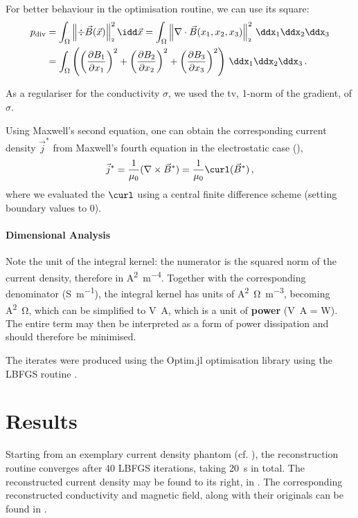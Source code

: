 \documentclass[10pt]{article}
\renewcommand{\norm}[1]{\left\lVert#1\right\rVert_{\scriptscriptstyle 2}}
\begin{document}
  For better behaviour in the optimisation routine, we can use its square:
  \begin{align*}
    p_{\rm div} & = \int_\Omega \norm{\div \vec{B}(\vec{x})}^2 \idd\vec{x} = \int_{\Omega} \norm{\nabla \cdot \vec{B}(x_1, x_2, x_3)}^2 \,\ddx_1\ddx_2\ddx_3                                                                \\
                & = \int_\Omega \left(\left(\frac{\partial B_1}{\partial x_1}\right)^2 + \left(\frac{\partial B_2}{\partial x_2}\right)^2 + \left(\frac{\partial B_3}{\partial x_3}\right)^2\right) \,\ddx_1\ddx_2\ddx_3\,.
  \end{align*}

  As a regulariser for the conductivity $\sigma$, we used the \gls{tv}, 1-norm of the gradient, of $\sigma$.

  Using Maxwell's second equation, one can obtain the corresponding current density $\vec{j}^*$ from Maxwell's fourth equation in the electrostatic case (),
  $$\vec{j}^* = \frac{1}{\mu_0} (\nabla \times \vec{B}^*) = \frac{1}{\mu_0} \curl(\vec{B}^*)\,,$$
  where we evaluated the $\curl$ using a central finite difference scheme (setting boundary values to 0).

  \paragraph{Dimensional Analysis}
  Note the unit of the integral kernel: the numerator is the squared norm of the current density, therefore in \unit{\ampere\squared\per\meter^4}. Together with the corresponding denominator (\unit{\siemens\per\meter}), the integral kernel has units of \unit{\ampere\squared\ohm\per\meter^3}, becoming \unit{\ampere\squared\ohm}, which can be simplified to \unit{\volt\ampere}, which is a unit of \textbf{power} (\unit{\volt\ampere} = \unit{W}).
  The entire term may then be interpreted as a form of power dissipation and should therefore be minimised.

  The iterates were produced using the Optim.jl optimisation library \parencite{2018-optim-jl} using the LBFGS routine \parencite{1989-lbfgs}.

  \section{Results}
  \label{sec:results}
  Starting from an exemplary current density phantom (cf. ), the reconstruction routine converges after 40 LBFGS iterations, taking \SI{20}{\second} in total.
  The reconstructed current density may be found to its right, in .
  The corresponding reconstructed conductivity and magnetic field, along with their originals can be found in .
\end{document}

